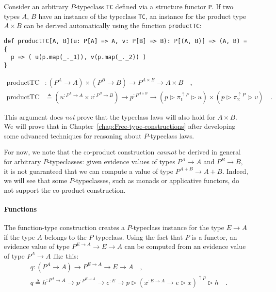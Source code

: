 Consider an arbitrary $P$-typeclass \lstinline!TC! defined via a
structure functor \lstinline!P!. If two types $A$, $B$ have an
instance of the typeclass \lstinline!TC!, an instance for the product
type $A\times B$ can be derived automatically using the function
\lstinline!productTC!:
\begin{lstlisting}
def productTC[A, B](u: P[A] => A, v: P[B] => B): P[(A, B)] => (A, B) = {
  p => ( u(p.map(_._1)), v(p.map(_._2)) )
}
\end{lstlisting}
\begin{align*}
\text{productTC} & :(P^{A}\rightarrow A)\times(P^{B}\rightarrow B)\rightarrow P^{A\times B}\rightarrow A\times B\quad,\\
\text{productTC} & \triangleq(u^{:P^{A}\rightarrow A}\times v^{:P^{B}\rightarrow B})\rightarrow p^{:P^{A\times B}}\rightarrow(p\triangleright\pi_{1}^{\uparrow P}\triangleright u)\times(p\triangleright\pi_{2}^{\uparrow P}\triangleright v)\quad.
\end{align*}

This argument does \emph{not} prove that the typeclass laws will also
hold for $A\times B$. We will prove that in Chapter~\ref{chap:Free-type-constructions}
after developing some advanced techniques for reasoning about $P$-typeclass
laws.

For now, we note that the co-product construction \emph{cannot} be
derived in general for arbitrary $P$-typeclasses: given evidence
values of types $P^{A}\rightarrow A$ and $P^{B}\rightarrow B$, it
is not guaranteed that we can compute a value of type $P^{A+B}\rightarrow A+B$.
Indeed, we will see that some $P$-typeclasses, such as monads or
applicative functors, do not support the co-product construction.

\paragraph{Functions}

The function-type construction creates a $P$-typeclass instance for
the type $E\rightarrow A$ if the type $A$ belongs to the $P$-typeclass.
Using the fact that $P$ is a functor, an evidence value of type $P^{E\rightarrow A}\rightarrow E\rightarrow A$
can be computed from an evidence value of type $P^{A}\rightarrow A$
like this:
\begin{align*}
 & q:(P^{A}\rightarrow A)\rightarrow P^{E\rightarrow A}\rightarrow E\rightarrow A\quad,\\
 & q\triangleq h^{:P^{A}\rightarrow A}\rightarrow p^{:P^{E\rightarrow A}}\rightarrow e^{:E}\rightarrow p\triangleright(x^{:E\rightarrow A}\rightarrow e\triangleright x)^{\uparrow P}\triangleright h\quad.
\end{align*}

